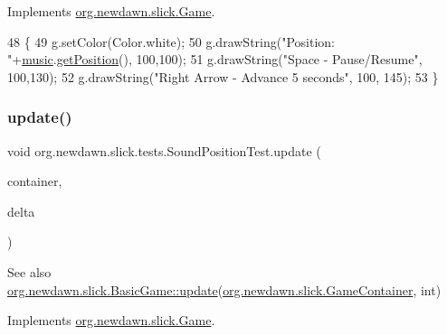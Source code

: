 Implements \mbox{\hyperlink{interfaceorg_1_1newdawn_1_1slick_1_1_game_af1a4670d43eb3ba04dfcf55ab1975b64}{org.\+newdawn.\+slick.\+Game}}.


\begin{DoxyCode}
48                                                             \{
49         g.setColor(Color.white);
50         g.drawString(\textcolor{stringliteral}{"Position: "}+\mbox{\hyperlink{classorg_1_1newdawn_1_1slick_1_1tests_1_1_sound_position_test_a58ef86e1bdbe61ff8fc326581f3c163c}{music}}.\mbox{\hyperlink{classorg_1_1newdawn_1_1slick_1_1_music_ae565f77bca4ad79f367d6abd90488b26}{getPosition}}(), 100,100);
51         g.drawString(\textcolor{stringliteral}{"Space - Pause/Resume"}, 100,130);
52         g.drawString(\textcolor{stringliteral}{"Right Arrow - Advance 5 seconds"}, 100, 145);
53     \}
\end{DoxyCode}
\mbox{\label{classorg_1_1newdawn_1_1slick_1_1tests_1_1_sound_position_test_af9544100baabfedae0c2787b218a2bad}} 
\subsubsection{\texorpdfstring{update()}{update()}}
{\footnotesize\ttfamily void org.\+newdawn.\+slick.\+tests.\+Sound\+Position\+Test.\+update (\begin{DoxyParamCaption}\item[{\mbox{\hyperlink{classorg_1_1newdawn_1_1slick_1_1_game_container}{Game\+Container}}}]{container,  }\item[{int}]{delta }\end{DoxyParamCaption})\hspace{0.3cm}{\ttfamily [inline]}}

\begin{DoxySeeAlso}{See also}
\mbox{\hyperlink{classorg_1_1newdawn_1_1slick_1_1_basic_game_acfe6fa05aef83bff1631af91a3e4bd20}{org.\+newdawn.\+slick.\+Basic\+Game\+::update}}(\mbox{\hyperlink{classorg_1_1newdawn_1_1slick_1_1_game_container}{org.\+newdawn.\+slick.\+Game\+Container}}, int) 
\end{DoxySeeAlso}


Implements \mbox{\hyperlink{interfaceorg_1_1newdawn_1_1slick_1_1_game_ab07b2e9463ee4631620dde0de25bdee8}{org.\+newdawn.\+slick.\+Game}}.


